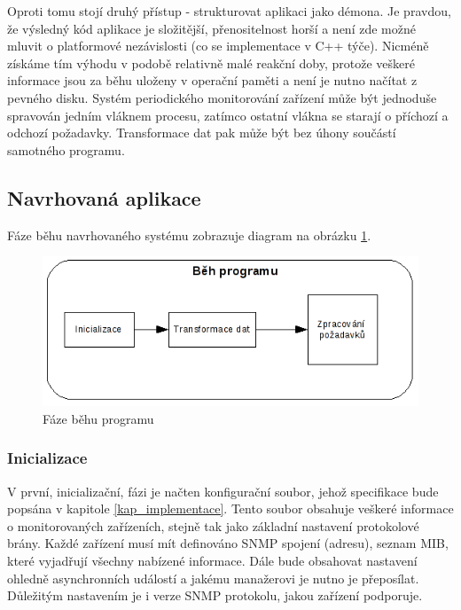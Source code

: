 Oproti tomu stojí druhý přístup - strukturovat aplikaci jako démona. Je pravdou, že výsledný kód aplikace je složitější, přenositelnost horší a není zde možné mluvit o platformové nezávislosti (co se implementace v C++ týče).
Nicméně získáme tím výhodu v podobě relativně malé reakční doby, protože veškeré informace jsou za běhu uloženy v operační paměti a není je nutno načítat z pevného disku. Systém periodického monitorování
zařízení může být jednoduše spravován jedním vláknem procesu, zatímco ostatní vlákna se starají o příchozí a odchozí požadavky. Transformace dat pak může být bez úhony součástí samotného programu.

\subsection{Navrhovaná aplikace}
Fáze běhu navrhovaného systému zobrazuje diagram na obrázku \ref{obr_an_beh_programu}.

\begin{figure}[htp]
	\begin{center}
		\includegraphics{obrazky/04_beh_programu.png}
		\caption{Fáze běhu programu}
		\label{obr_an_beh_programu}
	\end{center}
\end{figure}

\subsubsection{Inicializace}
V první, inicializační, fázi je načten konfigurační soubor, jehož specifikace bude popsána v kapitole \ref{kap_implementace}. Tento soubor obsahuje veškeré informace o monitorovaných zařízeních, stejně tak
jako základní nastavení protokolové brány. Každé zařízení musí mít definováno SNMP spojení (adresu), seznam MIB, které vyjadřují všechny nabízené informace. Dále bude obsahovat nastavení ohledně 
asynchronních událostí a jakému manažerovi je nutno je přeposílat. Důležitým nastavením je i verze SNMP protokolu, jakou zařízení podporuje.

